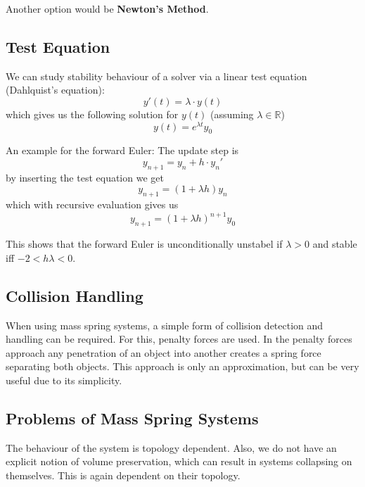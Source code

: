 \documentclass{article}
\begin{document}
Another option would be \textbf{Newton's Method}.

\subsection{Test Equation}
We can study stability behaviour of a solver via a linear test equation (Dahlquist's equation):
\begin{equation}
    \label{eq:dahlquist}
    y'(t) = \lambda \cdot y(t)
\end{equation}
which gives us the following solution for $y(t)$ (assuming $\lambda \in \mathbb{R}$)
\begin{equation}
    y(t) = e^{\lambda t} y_0
\end{equation}

An example for the forward Euler:
The update step is
\begin{equation}
    y_{n+1} = y_n + h \cdot y_n'
\end{equation}
by inserting the test equation we get
\begin{equation}
    y_{n+1} = (1 + \lambda h) y_n
\end{equation}
which with recursive evaluation gives us
\begin{equation}
    y_{n+1} = (1 + \lambda h)^{n+1} y_0
\end{equation}

This shows that the forward Euler is unconditionally unstabel if $\lambda > 0$ and stable iff $-2 < h\lambda < 0$.

\subsection{Collision Handling}
When using mass spring systems, a simple form of collision detection and handling can be required.
For this, penalty forces are used.
In the penalty forces approach any penetration of an object into another creates a spring force separating both objects.
This approach is only an approximation, but can be very useful due to its simplicity.

\subsection{Problems of Mass Spring Systems}
The behaviour of the system is topology dependent.
Also, we do not have an explicit notion of volume preservation, which can result in systems collapsing on themselves.
This is again dependent on their topology.
\end{document}
